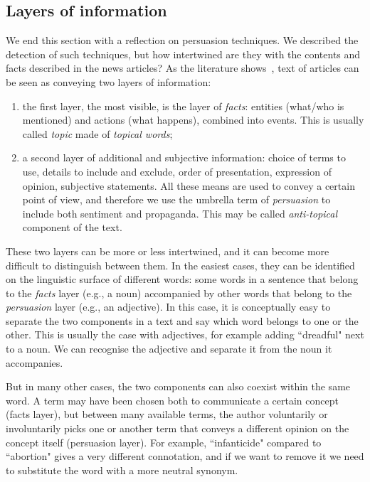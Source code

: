 \subsection{\statusgreen Layers of information}
\label{ssec:lit_layers_of_info}
We end this section with a reflection on persuasion techniques.
We described the detection of such techniques, but how intertwined are they with the contents and facts described in the news articles?
As the literature shows~\citep{jenkins2013thin,vanderwicken1995news,jang2023proximate}, text of articles can be seen as conveying two layers of information:
\begin{enumerate}
    \item the first layer, the most visible, is the layer of \emph{facts}: entities (what/who is mentioned) and actions (what happens), combined into events. This is usually called \emph{topic} made of \emph{topical words};
    \item a second layer of additional and subjective information: choice of terms to use, details to include and exclude, order of presentation, expression of opinion, subjective statements. All these means are used to convey a certain point of view, and therefore we use the umbrella term of \emph{persuasion} to include both sentiment and propaganda. This may be called \emph{anti-topical} component of the text.
\end{enumerate}



These two layers can be more or less intertwined, and it can become more difficult to distinguish between them.
In the easiest cases, they can be identified on the linguistic surface of different words: some words in a sentence that belong to the \emph{facts} layer (e.g., a noun) accompanied by other words that belong to the \emph{persuasion} layer (e.g., an adjective).
In this case, it is conceptually easy to separate the two components in a text and say which word belongs to one or the other.
This is usually the case with adjectives, for example adding ``dreadful" next to a noun. We can recognise the adjective and separate it from the noun it accompanies.

But in many other cases, the two components can also coexist within the same word. A term may have been chosen both to communicate a certain concept (facts layer), but between many available terms, the author voluntarily or involuntarily picks one or another term that conveys a different opinion on the concept itself (persuasion layer).
For example, ``infanticide" compared to ``abortion" gives a very different connotation, and if we want to remove it we need to substitute the word with a more neutral synonym.

